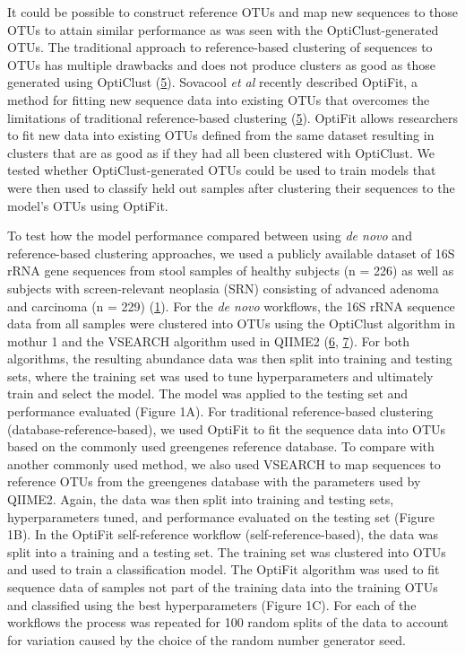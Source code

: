 \documentclass[
]{article}
\begin{document}
It could be possible to construct reference OTUs and map new sequences
to those OTUs to attain similar performance as was seen with the
OptiClust-generated OTUs. The traditional approach to reference-based
clustering of sequences to OTUs has multiple drawbacks and does not
produce clusters as good as those generated using OptiClust
(\protect\hyperlink{ref-sovacool2022}{5}). Sovacool \emph{et al}
recently described OptiFit, a method for fitting new sequence data into
existing OTUs that overcomes the limitations of traditional
reference-based clustering (\protect\hyperlink{ref-sovacool2022}{5}).
OptiFit allows researchers to fit new data into existing OTUs defined
from the same dataset resulting in clusters that are as good as if they
had all been clustered with OptiClust. We tested whether
OptiClust-generated OTUs could be used to train models that were then
used to classify held out samples after clustering their sequences to
the model's OTUs using OptiFit.

To test how the model performance compared between using \emph{de novo}
and reference-based clustering approaches, we used a publicly available
dataset of 16S rRNA gene sequences from stool samples of healthy
subjects (n = 226) as well as subjects with screen-relevant neoplasia
(SRN) consisting of advanced adenoma and carcinoma (n = 229)
(\protect\hyperlink{ref-baxter2016}{1}). For the \emph{de novo}
workflows, the 16S rRNA sequence data from all samples were clustered
into OTUs using the OptiClust algorithm in mothur 1 and the VSEARCH
algorithm used in QIIME2 (\protect\hyperlink{ref-rognes2016}{6},
\protect\hyperlink{ref-bolyen2019}{7}). For both algorithms, the
resulting abundance data was then split into training and testing sets,
where the training set was used to tune hyperparameters and ultimately
train and select the model. The model was applied to the testing set and
performance evaluated (Figure 1A). For traditional reference-based
clustering (database-reference-based), we used OptiFit to fit the
sequence data into OTUs based on the commonly used greengenes reference
database. To compare with another commonly used method, we also used
VSEARCH to map sequences to reference OTUs from the greengenes database
with the parameters used by QIIME2. Again, the data was then split into
training and testing sets, hyperparameters tuned, and performance
evaluated on the testing set (Figure 1B). In the OptiFit self-reference
workflow (self-reference-based), the data was split into a training and
a testing set. The training set was clustered into OTUs and used to
train a classification model. The OptiFit algorithm was used to fit
sequence data of samples not part of the training data into the training
OTUs and classified using the best hyperparameters (Figure 1C). For each
of the workflows the process was repeated for 100 random splits of the
data to account for variation caused by the choice of the random number
generator seed.
\end{document}
